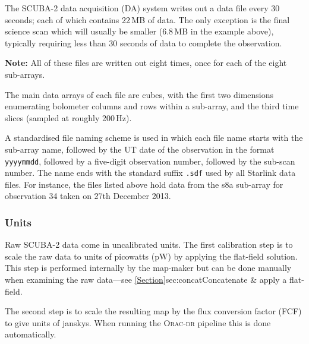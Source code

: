 The SCUBA-2 data acquisition (DA) system writes out a data file every
30 seconds; each of which contains 22\,MB of data. The only exception
is the final science scan which will usually be smaller (6.8\,MB in
the example above), typically requiring less than 30 seconds of data
to complete the observation.

\textbf{Note:} All of these files are written out eight times, once
for each of the eight sub-arrays.

The main data arrays of each file are cubes, with the first two
dimensions enumerating bolometer columns and rows within a sub-array,
and the third time slices (sampled at roughly 200\,Hz).

A standardised file naming scheme is used in which each file name starts
with the sub-array name, followed by the UT date of the observation in
the format \texttt{yyyymmdd}, followed by a five-digit observation
number, followed by the sub-scan number. The name ends with the standard
suffix \texttt{.sdf} used by all Starlink data files. For instance, the files
listed above hold data from the s8a sub-array for observation 34 taken on
27th December 2013.

\subsubsection*{Units}

Raw SCUBA-2 data come in uncalibrated units. The first calibration
step is to scale the raw data to units of picowatts (pW)
by applying the flat-field solution. This step is performed internally
by the map-maker but can be done manually when examining the raw
data---see \cref{Section}{sec:concat}{Concatenate \& apply a
  flat-field}.

The second step is to scale the resulting map by the flux conversion factor
(FCF) to give units of janskys. When running the
\textsc{Orac-dr} pipeline this is done automatically.


